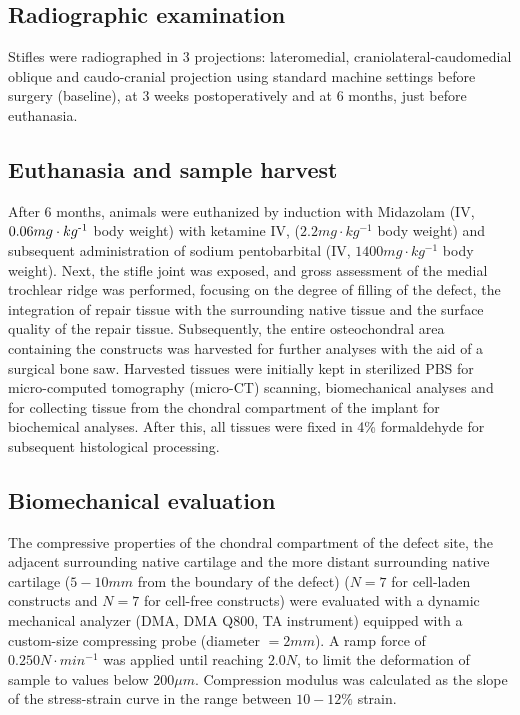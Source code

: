 \documentclass[twocolumn, serif, empirical, authordate, seplic]{jote-article}
\begin{document}
 {}\subsection*{Radiographic examination} 

Stifles were radiographed in 3 projections: lateromedial, craniolateral-caudomedial oblique and caudo-cranial projection using standard machine settings before surgery (baseline), at 3 weeks postoperatively and at 6 months, just before euthanasia.

 {}\subsection*{Euthanasia and sample harvest} 

After 6 months, animals were euthanized by induction with Midazolam (IV, $0.06mg\cdot kg\textsuperscript{-1}$ body weight) with ketamine IV, ($ 2.2 mg\cdot kg^{-1} $ body weight) and subsequent administration of sodium pentobarbital (IV, $ 1400 mg\cdot kg^{-1} $ body weight). Next, the stifle joint was exposed, and gross assessment of the medial trochlear ridge was performed, focusing on the degree of filling of the defect, the integration of repair tissue with the surrounding native tissue and the surface quality of the repair tissue. Subsequently, the entire osteochondral area containing the constructs was harvested for further analyses with the aid of a surgical bone saw. Harvested tissues were initially kept in sterilized PBS for micro-computed tomography (micro-CT) scanning, biomechanical analyses and for collecting tissue from the chondral compartment of the implant for biochemical analyses. After this, all tissues were fixed in 4\% formaldehyde for subsequent histological processing.

 {}\subsection*{Biomechanical evaluation} 

The compressive properties of the chondral compartment of the defect site, the adjacent surrounding native cartilage and the more distant surrounding native cartilage ($5 - 10 mm$ from the boundary of the defect) ($N=7$ for cell-laden constructs and $N=7$ for cell-free constructs) were evaluated with a dynamic mechanical analyzer (DMA, DMA Q800, TA instrument) equipped with a custom-size compressing probe (diameter $= 2 mm$). A ramp force of $ 0.250 N\cdot min^{-1} $ was applied until reaching $2.0 N$, to limit the deformation of sample to values below $200 \mu m$. Compression modulus was calculated as the slope of the stress-strain curve in the range between $10-12 \%$ strain.
\end{document}
